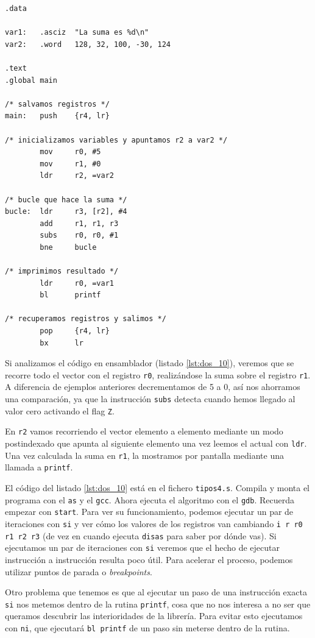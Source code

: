 \begin{lstlisting}[caption={Suma de elementos de un vector (tipos4.s)},label={lst:dos_10}]
.data

var1:   .asciz  "La suma es %d\n"
var2:   .word   128, 32, 100, -30, 124

.text
.global main

/* salvamos registros */
main:   push    {r4, lr}

/* inicializamos variables y apuntamos r2 a var2 */
        mov     r0, #5
        mov     r1, #0
        ldr     r2, =var2

/* bucle que hace la suma */
bucle:  ldr     r3, [r2], #4
        add     r1, r1, r3
        subs    r0, r0, #1
        bne     bucle

/* imprimimos resultado */
        ldr     r0, =var1
        bl      printf

/* recuperamos registros y salimos */
        pop     {r4, lr}
        bx      lr
\end{lstlisting}

Si analizamos el código en ensamblador (listado \ref{lst:dos_10}), veremos que se
recorre todo el vector con el registro {\tt r0}, realizándose la suma sobre el
registro {\tt r1}. A diferencia de ejemplos anteriores decrementamos de 5 a 0, así
nos ahorramos una comparación, ya que la instrucción {\tt subs} detecta cuando hemos
llegado al valor cero activando el flag {\tt Z}.

En {\tt r2} vamos recorriendo el vector elemento a elemento mediante un modo postindexado
que apunta al siguiente elemento una vez leemos el actual con {\tt ldr}. Una vez calculada
la suma en {\tt r1}, la mostramos por pantalla mediante una llamada a {\tt printf}.

El código del listado \ref{lst:dos_10} está en el fichero {\tt tipos4.s}. Compila y
monta el programa con el {\tt as} y el {\tt gcc}. Ahora ejecuta el algoritmo
con el {\tt gdb}. Recuerda empezar con {\tt start}. Para ver su funcionamiento,
podemos ejecutar un par de iteraciones con {\tt si} y ver cómo los valores de
los registros van cambiando {\tt i r r0 r1 r2 r3} (de vez en cuando ejecuta
{\tt disas} para saber por dónde vas). Si ejecutamos un par de iteraciones con
{\tt si} veremos que el hecho de ejecutar instrucción a instrucción resulta
poco útil. Para acelerar el proceso, podemos utilizar puntos de parada o {\it breakpoints}.

Otro problema que tenemos es que al ejecutar un paso de una instrucción exacta {\tt si}
nos metemos dentro de la rutina {\tt printf}, cosa que no nos interesa a no ser que queramos
descubrir las interioridades de la librería. Para evitar esto ejecutamos con {\tt ni}, que
ejecutará {\tt bl printf} de un paso sin meterse dentro de la rutina.

